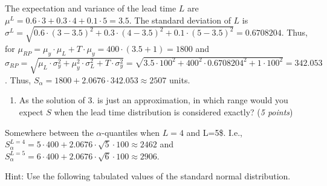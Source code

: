\documentclass[
]{article}
\providecommand{\tightlist}{%
  \setlength{\itemsep}{0pt}\setlength{\parskip}{0pt}}
\begin{document}
The expectation and variance of the lead time \(L\) are
\(\mu^L = 0.6 \cdot 3 + 0.3 \cdot 4 + 0.1 \cdot 5= 3.5\). The standard
deviation of \(L\) is
\(\sigma^L = \sqrt{0.6 \cdot (3-3.5)^2 + 0.3 \cdot (4-3.5)^2 + 0.1 \cdot (5-3.5)^2} = 0.6708204\).
Thus, for
\(\mu_{RP} = \mu_y \cdot \mu_L + T \cdot \mu_y = 400 \cdot (3.5 + 1 ) = 1800\)
and
\(\sigma_{RP} = \sqrt{\mu_L \cdot \sigma^2_y + \mu^2_y \cdot \sigma_L^2 + T \cdot \sigma_y^2} = \sqrt{3.5\cdot 100^2 + 400^2\cdot 0.6708204^2+ 1\cdot 100^2 } = 342.053\).
Thus, \(S_{\alpha} = 1800 + 2.0676 \cdot 342.053 \approx 2507\) units.

\begin{enumerate}
\def\labelenumi{\arabic{enumi}.}
\setcounter{enumi}{3}
\tightlist
\item
  As the solution of 3. is just an approximation, in which range would
  you expect \(S\) when the lead time distribution is considered
  exactly? (\emph{5 points})
\end{enumerate}

Somewhere between the \(\alpha\)-quantiles when \(L=4\) and L=5\$. I.e.,
\(S^{L=4}_{\alpha} = 5 \cdot 400 + 2.0676 \cdot \sqrt{5} \cdot 100 \approx 2462\)
and
\(S^{L=5}_{\alpha} = 6 \cdot 400 + 2.0676 \cdot \sqrt{6} \cdot 100 \approx 2906\).

Hint: Use the following tabulated values of the standard normal
distribution.
\end{document}
